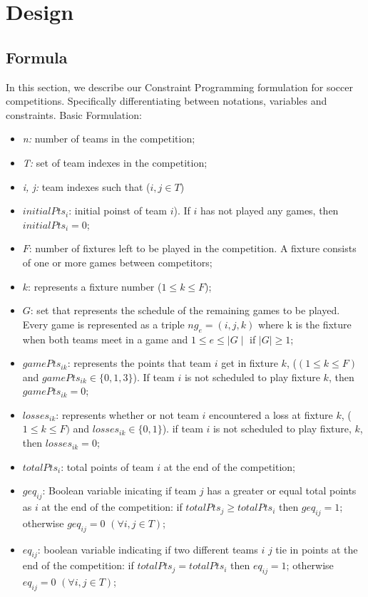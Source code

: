 \documentclass{article}
\begin{document}
	
	\newpage
	\section{Design}
	\subsection{Formula}
	In this section, we describe our Constraint Programming formulation for soccer competitions. Specifically differentiating between notations, variables and constraints.
	Basic Formulation: 
	\begin{itemize}
		\item \textit{n:} number of teams in the competition;
		\item \textit{T:} set of team indexes in the competition;
		\item \textit{i, j:} team indexes such that (\(i, j \in T\))
		\item \(initialPts_i\): initial poinst of team \(i\)). If \(i\) has not played any games, then \(initialPts_i=0\);
		\item \(F\): number of fixtures left to be played in the competition. A fixture consists
		of one or more games between competitors;
		\item \(k\): represents a fixture number (\(1 \leq k \leq F\));
		\item \(G\): set that represents the schedule of the remaining games to be played. Every game is represented as a triple \(ng_e = (i,j,k)\) where k is the fixture when both teams meet in a game and \(1 \leq e \leq \mid G\mid \) if \(\mid G \mid \geq 1 \);
		\item \(gamePts_{ik}\): represents the points that team \(i\) get in fixture \(k\), (\((1 \leq k \leq F)\) and \(gamePts_{ik} \in \{ 0, 1, 3 \} \)). If team \(i\) is not scheduled to play fixture \(k\), then \(gamePts_{ik} = 0\);
		\item \(losses_{ik}\): represents whether or not team \(i\) encountered a loss at fixture \(k\), (\(1 \leq k \leq F) \) and \(losses_{ik} \in \{0, 1\} \)). if team \(i\) is not scheduled to play fixture, \(k\), then \(losses_{ik} = 0\);
		\item \(totalPts_i\): total points of team \(i\) at the end of the competition;
		\item \(geq_{ij}\): Boolean variable inicating if team \(j\) has a greater or equal total points as \(i\) at the end of the competition: if \(totalPts_j \geq totalPts_i\) then \(geq_{ij} = 1\); otherwise \(geq_{ij} = 0\) \((\forall i, j \in T)\);
		\item \(eq_{ij}\): boolean variable indicating if two different teams \(i\) \(j\) tie in points at the end of the competition: if \(totalPts_j = totalPts_i\) then \(eq_{ij} = 1\); otherwise \(eq_{ij} = 0\) \((\forall i, j \in T)\);
	\end{itemize}
\end{document}
